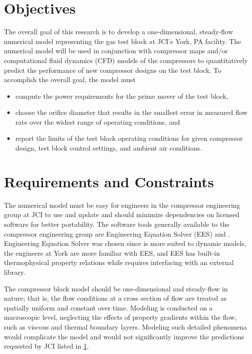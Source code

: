 \section{Objectives} \label{sec:objective}
The overall goal of this research is to develop a one-dimensional, steady-flow numerical model 
representing the  gas test block at JCI's York, PA facility. 
The numerical model will be used in conjunction with compressor maps and/or computational fluid dynamics (CFD)%
models of the compressors to quantitatively predict the performance of new compressor designs on the test block. 
To accomplish the overall goal, the model must
\begin{itemize}
  \item compute the power requirements for the prime mover of the test block,
  \item choose the orifice diameter that results in the smallest error in measured
    flow rate over the widest range of operating conditions, and 
  \item report the limits of the test block operating conditions for given compressor 
		design, test block control settings, and ambient air conditions.
\end{itemize}

\section{Requirements and Constraints} \label{sec:requirements}
The numerical model must be easy for engineers in the compressor engineering group at JCI 
to use and update and should minimize dependencies on licensed software for better portability. 
The software tools generally available to the compressor engineering group are 
Engineering Equation Solver (EES) and \MLS{}. 
Engineering Equation Solver was chosen since \MLS{} is more suited to dynamic models, 
the engineers at York are more familiar with EES, 
and EES has built-in thermophysical property relations 
while \MLS{} requires interfacing with an external library.

The compressor block model should be one-dimensional and steady-flow in nature; 
that is, the flow conditions at a cross section of flow 
are treated as spatially uniform and constant over time. 
Modeling is conducted on a macroscopic level, 
neglecting the effects of property gradients within the flow, 
such as viscous and thermal boundary layers. 
Modeling such detailed phenomena would complicate the model 
and would not significantly improve the predictions requested by JCI listed in \cref{sec:objective}.

